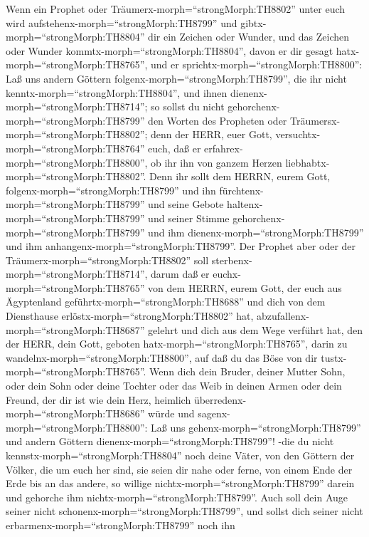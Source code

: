  Wenn ein Prophet oder Träumerx-morph=``strongMorph:TH8802''
unter euch wird aufstehenx-morph=``strongMorph:TH8799'' und
gibtx-morph=``strongMorph:TH8804'' dir ein Zeichen oder Wunder,
 und das Zeichen oder Wunder
kommtx-morph=``strongMorph:TH8804'', davon er dir gesagt
hatx-morph=``strongMorph:TH8765'', und er
sprichtx-morph=``strongMorph:TH8800'': Laß uns andern Göttern
folgenx-morph=``strongMorph:TH8799'', die ihr nicht
kenntx-morph=``strongMorph:TH8804'', und ihnen
dienenx-morph=``strongMorph:TH8714'';  so sollst du nicht
gehorchenx-morph=``strongMorph:TH8799'' den Worten des Propheten oder
Träumersx-morph=``strongMorph:TH8802''; denn der HERR, euer Gott,
versuchtx-morph=``strongMorph:TH8764'' euch, daß er
erfahrex-morph=``strongMorph:TH8800'', ob ihr ihn von ganzem Herzen
liebhabtx-morph=``strongMorph:TH8802''.  Denn ihr sollt dem
HERRN, eurem Gott, folgenx-morph=``strongMorph:TH8799'' und ihn
fürchtenx-morph=``strongMorph:TH8799'' und seine Gebote
haltenx-morph=``strongMorph:TH8799'' und seiner Stimme
gehorchenx-morph=``strongMorph:TH8799'' und ihm
dienenx-morph=``strongMorph:TH8799'' und ihm
anhangenx-morph=``strongMorph:TH8799''.  Der Prophet aber
oder der Träumerx-morph=``strongMorph:TH8802'' soll
sterbenx-morph=``strongMorph:TH8714'', darum daß er
euchx-morph=``strongMorph:TH8765'' von dem HERRN, eurem Gott, der euch
aus Ägyptenland geführtx-morph=``strongMorph:TH8688'' und dich von dem
Diensthause erlöstx-morph=``strongMorph:TH8802'' hat,
abzufallenx-morph=``strongMorph:TH8687'' gelehrt und dich aus dem Wege
verführt hat, den der HERR, dein Gott, geboten
hatx-morph=``strongMorph:TH8765'', darin zu
wandelnx-morph=``strongMorph:TH8800'', auf daß du das Böse von dir
tustx-morph=``strongMorph:TH8765''.  Wenn dich dein Bruder,
deiner Mutter Sohn, oder dein Sohn oder deine Tochter oder das Weib in
deinen Armen oder dein Freund, der dir ist wie dein Herz, heimlich
überredenx-morph=``strongMorph:TH8686'' würde und
sagenx-morph=``strongMorph:TH8800'': Laß uns
gehenx-morph=``strongMorph:TH8799'' und andern Göttern
dienenx-morph=``strongMorph:TH8799''! -die du nicht
kennstx-morph=``strongMorph:TH8804'' noch deine Väter,  von
den Göttern der Völker, die um euch her sind, sie seien dir nahe oder
ferne, von einem Ende der Erde bis an das andere,  so
willige nichtx-morph=``strongMorph:TH8799'' darein und gehorche ihm
nichtx-morph=``strongMorph:TH8799''. Auch soll dein Auge seiner nicht
schonenx-morph=``strongMorph:TH8799'', und sollst dich seiner nicht
erbarmenx-morph=``strongMorph:TH8799'' noch ihn
